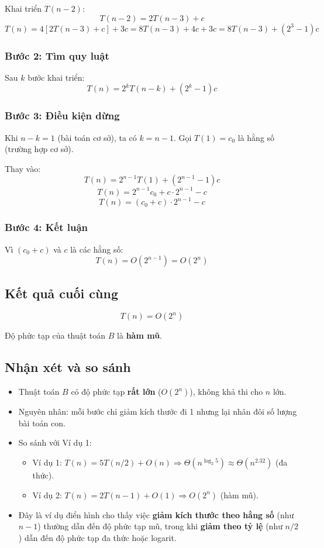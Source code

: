 \documentclass{article}
\begin{document}
Khai triển \(T(n-2)\):
\[
T(n-2) = 2T(n-3) + c
\]
\[
T(n) = 4[2T(n-3) + c] + 3c = 8T(n-3) + 4c + 3c = 8T(n-3) + (2^3 - 1)c
\]

\subsubsection{Bước 2: Tìm quy luật}

Sau \(k\) bước khai triển:
\[
T(n) = 2^k T(n-k) + (2^k - 1)c
\]

\subsubsection{Bước 3: Điều kiện dừng}

Khi \(n - k = 1\) (bài toán cơ sở), ta có \(k = n - 1\).
Gọi \(T(1) = c_0\) là hằng số (trường hợp cơ sở).

Thay vào:
\[
T(n) = 2^{n-1} T(1) + (2^{n-1} - 1)c
\]
\[
T(n) = 2^{n-1} c_0 + c \cdot 2^{n-1} - c
\]
\[
T(n) = (c_0 + c) \cdot 2^{n-1} - c
\]

\subsubsection{Bước 4: Kết luận}

Vì \((c_0 + c)\) và \(c\) là các hằng số:
\[
T(n) = O(2^{n-1}) = O(2^n)
\]

\subsection{Kết quả cuối cùng}

\[
\boxed{T(n) = O(2^n)}
\]

Độ phức tạp của thuật toán \(B\) là \textbf{hàm mũ}.

\subsection{Nhận xét và so sánh}

\begin{itemize}
    \item Thuật toán \(B\) có độ phức tạp \textbf{rất lớn} (\(O(2^n)\)), không khả thi cho \(n\) lớn.
    \item Nguyên nhân: mỗi bước chỉ giảm kích thước đi 1 nhưng lại nhân đôi số lượng bài toán con.
    \item So sánh với Ví dụ 1:
    \begin{itemize}
        \item Ví dụ 1: \(T(n) = 5T(n/2) + O(n) \Rightarrow \Theta(n^{\log_2 5}) \approx \Theta(n^{2.32})\) (đa thức).
        \item Ví dụ 2: \(T(n) = 2T(n-1) + O(1) \Rightarrow O(2^n)\) (hàm mũ).
    \end{itemize}
    \item Đây là ví dụ điển hình cho thấy việc \textbf{giảm kích thước theo hằng số} (như \(n-1\)) thường dẫn đến độ phức tạp mũ, trong khi \textbf{giảm theo tỷ lệ} (như \(n/2\)) dẫn đến độ phức tạp đa thức hoặc logarit.
\end{itemize}
\end{document}
